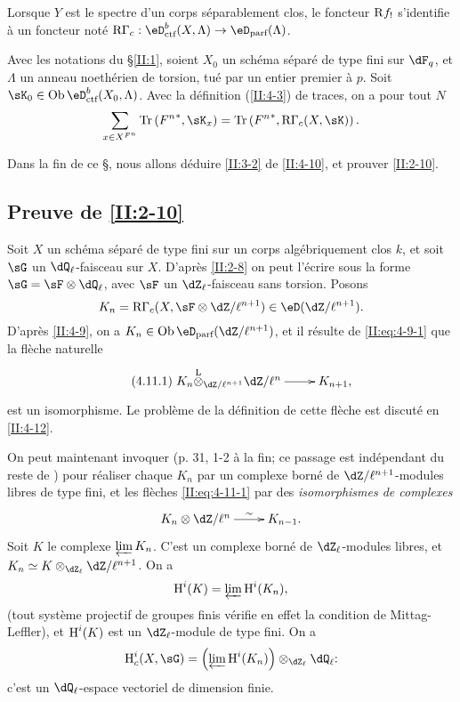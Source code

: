 Lorsque $Y$ est le spectre d'un corps séparablement clos, le foncteur $\mathrm{R} f_!$ 
s'identifie à un foncteur noté 
$\eR \Gamma_c : \eD_\text{ctf}^b(X,\Lambda)\to\eD_\text{parf}(\Lambda)$. 





\begin{theorem_}\label{II:4-10}
Avec les notations du \S\ref{II:1}, soient $X_0$ un schéma séparé de type 
fini sur $\dF_q$, et $\Lambda$ un anneau noethérien de torsion, tué par un 
entier premier à $p$. Soit $\sK_0\in\ob\eD_\textnormal{ctf}^b(X_0,\Lambda)$. 
Avec la définition (\ref{II:4-3}) de traces, on a pour tout $N$ 
\begin{equation*}\label{II:eq:4-10}
  \sum_{x\in X^{F^n}} \tr\left({F^n}^*,\sK_x\right) = \tr\left({F^n}^*,\eR\Gamma_c(X,\sK)\right) \text{.}
\end{equation*}
\end{theorem_}

Dans la fin de ce \S, nous allons déduire \ref{II:3-2} de \ref{II:4-10}, et 
prouver \ref{II:2-10}. 





\subsection{Preuve de \texorpdfstring{\ref{II:2-10}}{2.10}}\label{II:4-11}

Soit $X$ un schéma séparé de type fini sur un corps algébriquement clos 
$k$, et soit $\sG$ un $\dQ_\ell$-faisceau sur $X$. D'après \ref{II:2-8} on 
peut l'écrire sous la forme $\sG=\sF\otimes\dQ_\ell$, avec $\sF$ un 
$\dZ_\ell$-faisceau sans torsion. Posons 
\[
  K_n = \eR \Gamma_c(X,\sF\otimes\dZ/\ell^{n+1})\in\eD(\dZ/\ell^{n+1}) \text{.}
\]
D'après \ref{II:4-9}, on a $K_n\in\ob\eD_\text{parf}(\dZ/\ell^{n+1})$, et il 
résulte de \eqref{II:eq:4-9-1} que la flèche naturelle 
\begin{equation*}\tag{4.11.1}\label{II:eq:4-11-1}
\xymatrix{
  K_n\lotimes_{\dZ/\ell^{n+1}} \dZ/\ell^n \ar[r] & K_{n+1} \text{,}
}
\end{equation*}
est un isomorphisme. Le problème de la définition de cette flèche est 
discuté en \ref{II:4-12}. 

On peut maintenant invoquer \cite[XI.3.3]{sga5} (p. 31, 1-2 à la fin; ce 
passage est indépendant du reste de \cite{sga5}) pour réaliser chaque 
$K_n$ par un complexe borné de $\dZ/\ell^{n+1}$-modules libres de type fini, 
et les flèches \eqref{II:eq:4-11-1} par des \emph{isomorphismes de complexes} 
\[\xymatrix{
  K_n\otimes \dZ/\ell^n \ar[r]^-\sim 
    & K_{n-1} \text{.}
}\]
Soit $K$ le complexe $\varprojlim K_n$. C'est un complexe borné de 
$\dZ_\ell$-modules libres, et $K_n\simeq K\otimes_{\dZ_\ell}\dZ/\ell^{n+1}$. On 
a 
\[
  \operatorname{H}^i(K) = \varprojlim \operatorname{H}^i(K_n) \text{,}
\]
(tout système projectif de groupes finis vérifie en effet la condition de 
Mittag-Leffler), et $\operatorname{H}^i(K)$ est un $\dZ_\ell$-module de type fini. On a 
\[
  \h_c^i(X,\sG) = \left(\varprojlim \h^i(K_n) \right)\otimes_{\dZ_\ell} \dQ_\ell \text{:}
\]
c'est un $\dQ_\ell$-espace vectoriel de dimension finie. 






